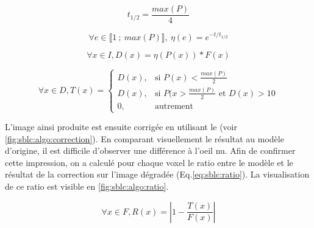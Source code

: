 \documentclass[\main/main.tex]{subfiles}
\begin{document}
\begin{equation}
    \label{eq:sblc:half}
    t_{1/2} = \frac{max(P)}{4}
\end{equation}

\begin{equation}
    \label{eq:sblc:exp}
    \forall{} e \in \llbracket 1~;~max(P) \rrbracket,~\eta(e) = e^{- t/ t_{1/2}}
\end{equation}

\begin{equation}
    \label{eq:sblc:decay}
    \forall{} x \in I, D(x) =\eta{}(P(x)) * F(x)
\end{equation}

\begin{equation}
    \label{eq:sblc:seuillage}
    \forall{} x \in D, T(x) = 
    \begin{cases}
        D(x), & \text{si } P(x) < \frac{max(P)}{2} \\
        D(x), & \text{si } P(x > \frac{max(P)}{2} \text{ et } D(x) > 10\\
        0, & \text{autrement}
    \end{cases}
\end{equation}

%
L'image ainsi produite est ensuite corrigée en utilisant le \sblc{} (voir \autoref{fig:sblc:algo:correction}).
%
En comparant visuellement le résultat au modèle d'origine, il est difficile d'observer une différence à l'oeil nu.
%
Afin de confirmer cette impression, on a calculé pour chaque voxel le ratio entre le modèle et le résultat de la correction sur l'image dégradée (Eq.\eqref{eq:sblc:ratio}).
%
La visualisation de ce ratio est visible en \autoref{fig:sblc:algo:ratio}.

\begin{equation}
    \label{eq:sblc:ratio}
    \forall x \in F, R(x) = \left| 1 - \frac{T(x)}{F(x)} \right|
\end{equation}
\end{document}

